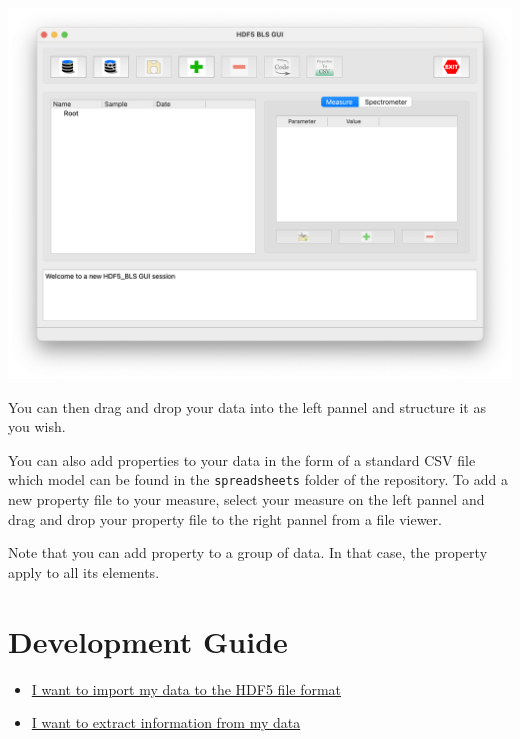 \documentclass{book}
\begin{document}
            \begin{center}
                \includegraphics[width=\textwidth]{img/main_window.png}
            \end{center}

            You can then drag and drop your data into the left pannel and structure it as you wish. 
            
            You can also add properties to your data in the form of a standard CSV file which model can be found in the \texttt{spreadsheets} folder of the repository. To add a new property file to your measure, select your measure on the left pannel and drag and drop your property file to the right pannel from a file viewer. 
            
            Note that you can add property to a group of data. In that case, the property apply to all its elements.

\chapter{Development Guide} \label{chapter:dev_guide}

    \begin{tcolorbox}[title=Why are you here?]
        \begin{itemize}
            \item \hyperref[sec:load_data]{I want to import my data to the HDF5 file format}
            \item \hyperref[sec:treatment]{I want to extract information from my data }
        \end{itemize}
    \end{tcolorbox}
\end{document}
